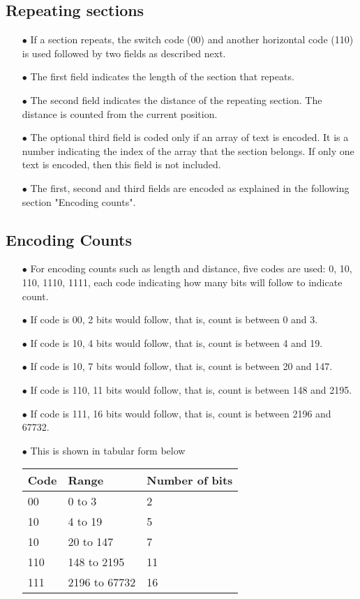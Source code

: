 \documentclass[]{article}
\begin{document}
	\subsection{Repeating sections}
	\begin{itemize}
		\item[$\bullet$] If a section repeats, the switch code (00) and another horizontal code (110) is used followed by two fields as described next.
		\item[$\bullet$] The first field indicates the length of the section that repeats.
		\item[$\bullet$] The second field indicates the distance of the repeating section. The distance is counted from the current position.
		\item[$\bullet$] The optional third field is coded only if an array of text is encoded. It is a number indicating the index of the array that the section belongs. If only one text is encoded, then this field is not included. 
		\item[$\bullet$] The first, second and third fields are encoded as explained in the following section "Encoding counts".
	\end{itemize}
	
	\subsection{Encoding Counts}
	\begin{itemize}
		\item[$\bullet$] For encoding counts such as length and distance, five codes are used: 0, 10, 110, 1110, 1111, each code indicating how many bits will follow to indicate count.
		\item[$\bullet$] If code is 00, 2 bits would follow, that is, count is between 0 and 3.
		\item[$\bullet$] If code is 10, 4 bits would follow, that is, count is between 4 and 19.
		\item[$\bullet$] If code is 10, 7 bits would follow, that is, count is between 20 and 147.
		\item[$\bullet$] If code is 110, 11 bits would follow, that is, count is between 148 and 2195.
		\item[$\bullet$] If code is 111, 16 bits would follow, that is, count is between 2196 and 67732.
		\item[$\bullet$] This is shown in tabular form below
		\item[] \begin{tabular}{ | l | l | l |} \hline
			\textbf{Code} & \textbf{Range} & \textbf{Number of bits} \\ \hline
			00 & 0 to 3 & 2 \\ \hline
			10 & 4 to 19 & 5 \\ \hline
			10 & 20 to 147 & 7 \\ \hline
			110 & 148 to 2195 & 11 \\ \hline
			111 & 2196 to 67732 & 16 \\ \hline
		\end{tabular}
	\end{itemize}
	
\end{document}
